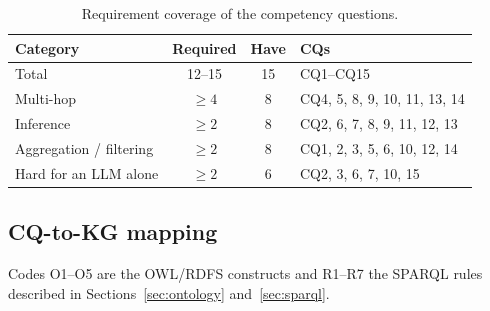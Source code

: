 \begin{table}[H]\centering\small
\begin{tabular}{lccl}
\toprule
\textbf{Category} & \textbf{Required} & \textbf{Have} & \textbf{CQs} \\ \midrule
Total & 12--15 & 15 & CQ1--CQ15 \\
Multi-hop & $\geq 4$ & 8 & CQ4, 5, 8, 9, 10, 11, 13, 14 \\
Inference & $\geq 2$ & 8 & CQ2, 6, 7, 8, 9, 11, 12, 13 \\
Aggregation / filtering & $\geq 2$ & 8 & CQ1, 2, 3, 5, 6, 10, 12, 14 \\
Hard for an LLM alone & $\geq 2$ & 6 & CQ2, 3, 6, 7, 10, 15 \\
\bottomrule
\end{tabular}
\caption{Requirement coverage of the competency questions.}
\end{table}

\subsection{CQ-to-KG mapping}
Codes O1--O5 are the OWL/RDFS constructs and R1--R7 the SPARQL rules described in Sections~\ref{sec:ontology}
and~\ref{sec:sparql}.

